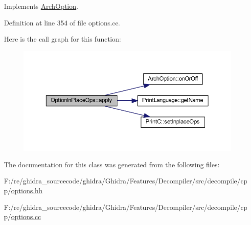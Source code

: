 Implements \mbox{\hyperlink{class_arch_option_a5dc1b3adaee0d11e6018b85640272498}{Arch\+Option}}.



Definition at line 354 of file options.\+cc.

Here is the call graph for this function\+:
\nopagebreak
\begin{figure}[H]
\begin{center}
\leavevmode
\includegraphics[width=350pt]{class_option_in_place_ops_aef329cdeae9d51c6059ef7ca9233662f_cgraph}
\end{center}
\end{figure}


The documentation for this class was generated from the following files\+:\begin{DoxyCompactItemize}
\item 
F\+:/re/ghidra\+\_\+sourcecode/ghidra/\+Ghidra/\+Features/\+Decompiler/src/decompile/cpp/\mbox{\hyperlink{options_8hh}{options.\+hh}}\item 
F\+:/re/ghidra\+\_\+sourcecode/ghidra/\+Ghidra/\+Features/\+Decompiler/src/decompile/cpp/\mbox{\hyperlink{options_8cc}{options.\+cc}}\end{DoxyCompactItemize}
